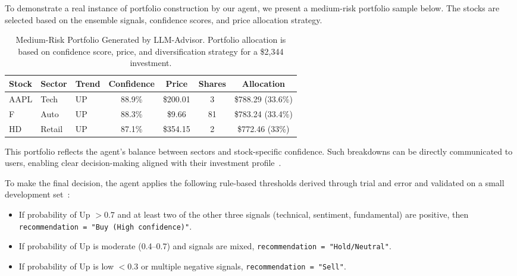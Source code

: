 \documentclass[conference]{IEEEtran}
\begin{document}
To demonstrate a real instance of portfolio construction by our agent, we present a medium-risk portfolio sample below. The stocks are selected based on the ensemble signals, confidence scores, and price allocation strategy.


\begin{table*}[htbp]
\renewcommand{\arraystretch}{1.3} %
\centering
\caption{Medium-Risk Portfolio Generated by LLM-Advisor. Portfolio allocation is based on confidence score, price, and diversification strategy for a \$2,344 investment.}
\label{tab:medium_portfolio}
\begin{tabular}{|l|l|l|c|c|c|c|}
\hline
\textbf{Stock} & \textbf{Sector} & \textbf{Trend} & \textbf{Confidence} & \textbf{Price} & \textbf{Shares} & \textbf{Allocation} \\
\hline
AAPL & Tech   & UP & 88.9\% & \$200.01 & 3 & \$788.29 (33.6\%) \\
\hline
F    & Auto   & UP & 88.3\% & \$9.66   & 81 & \$783.24 (33.4\%) \\
\hline
HD   & Retail & UP & 87.1\% & \$354.15 & 2 & \$772.46 (33\%) \\
\hline
\end{tabular}
\end{table*}


\vspace{0.5em}
This portfolio reflects the agent’s balance between sectors and stock-specific confidence. Such breakdowns can be directly communicated to users, enabling clear decision-making aligned with their investment profile~\cite{lakkaraju2023}.

\vspace{0.5em}

To make the final decision, the agent applies the following rule-based thresholds derived through trial and error and validated on a small development set~\cite{hossain2019}:
\begin{itemize}
    \item If probability of Up $>0.7$ and at least two of the other three signals (technical, sentiment, fundamental) are positive, then \texttt{recommendation = "Buy (High confidence)"}.
    \item If probability of Up is moderate (0.4--0.7) and signals are mixed, \texttt{recommendation = "Hold/Neutral"}.
    \item If probability of Up is low $<0.3$ or multiple negative signals, \texttt{recommendation = "Sell"}.
\end{itemize}
\end{document}
